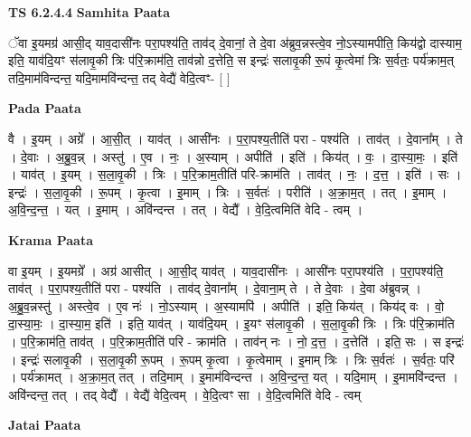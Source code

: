 \documentclass[17pt]{extarticle}
\begin{document}
\textbf{TS 6.2.4.4 } \newline
\textbf{Samhita Paata} \newline

ॅवा इ॒यमग्र॑ आसी॒द् याव॒दासी॑नः परा॒पश्य॑ति॒ ताव॑द् दे॒वानां॒ ते दे॒वा अ॑ब्रुव॒न्नस्त्वे॒व नो॒ऽस्यामपीति॒ किय॑द्वो दास्याम॒ इति॒ याव॑दि॒यꣳ स॑लावृ॒की त्रिः प॑रि॒क्राम॑ति॒ ताव॑न्नो द॒त्तेति॒ स इन्द्रः॑ सलावृ॒की रू॒पं कृ॒त्वेमां त्रिः स॒र्वतः॒ पर्य॑क्राम॒त् तदि॒माम॑विन्दन्त॒ यदि॒मामवि॑न्दन्त॒ तद् वेद्यै॑ वेदि॒त्वꣳ- [  ] \newline

\textbf{Pada Paata} \newline

वै । इ॒यम् । अग्रे᳚ । आ॒सी॒त् । याव॑त् । आसी॑नः । प॒रा॒पश्य॒तीति॑ परा - पश्य॑ति । ताव॑त् । दे॒वाना᳚म् । ते । दे॒वाः । अ॒ब्रु॒व॒न्न् । अस्तु॑ । ए॒व । नः॒ । अ॒स्याम् । अपीति॑ । इति॑ । किय॑त् । वः॒ । दा॒स्या॒मः॒ । इति॑ । याव॑त् । इ॒यम् । स॒ला॒वृ॒की । त्रिः । प॒रि॒क्राम॒तीति॑ परि-क्राम॑ति । ताव॑त् । नः॒ । द॒त्त॒ । इति॑ । सः । इन्द्रः॑ । स॒ला॒वृ॒की । रू॒पम् । कृ॒त्वा । इ॒माम् । त्रिः । स॒र्वतः॑ । परीति॑ । अ॒क्रा॒म॒त् । तत् । इ॒माम् । अ॒वि॒न्द॒न्त॒ । यत् । इ॒माम् । अवि॑न्दन्त । तत् । वेद्यै᳚ । वे॒दि॒त्वमिति॑ वेदि - त्वम् ।  \newline


\textbf{Krama Paata} \newline

वा इ॒यम् । इ॒यमग्रे᳚ । अग्र॑ आसीत् । आ॒सी॒द् याव॑त् । याव॒दासी॑नः । आसी॑नः परा॒पश्य॑ति । प॒रा॒पश्य॑ति॒ ताव॑त् । प॒रा॒पश्य॒तीति॑ परा - पश्य॑ति । ताव॑द् दे॒वाना᳚म् । दे॒वाना॒म् ते । ते दे॒वाः । दे॒वा अ॑ब्रुवन्न् । अ॒ब्रु॒व॒न्नस्तु॑ । अस्त्वे॒व । ए॒व नः॑ । नो॒ऽस्याम् । अ॒स्यामपि॑ । अपीति॑ । इति॒ किय॑त् । किय॑द् वः । वो॒ दा॒स्या॒मः॒ । दा॒स्या॒म॒ इति॑ । इति॒ याव॑त् । याव॑दि॒यम् । इ॒यꣳ स॑लावृ॒की । स॒ला॒वृ॒की त्रिः । त्रिः प॑रि॒क्राम॑ति । प॒रि॒क्राम॑ति॒ ताव॑त् । प॒रि॒क्राम॒तीति॑ परि - क्राम॑ति । ताव॑न् नः । नो॒ द॒त्त॒ । द॒त्तेति॑ । इति॒ सः । स इन्द्रः॑ । इन्द्रः॑ सलावृ॒की । स॒ला॒वृ॒की रू॒पम् । रू॒पम् कृ॒त्वा । कृ॒त्वेमाम् । इ॒माम् त्रिः । त्रिः स॒र्वतः॑ । स॒र्वतः॒ परि॑ । पर्य॑क्रामत् । अ॒क्रा॒म॒त् तत् । तदि॒माम् । इ॒माम॑विन्दन्त । अ॒वि॒न्द॒न्त॒ यत् । यदि॒माम् । इ॒मामवि॑न्दन्त । अवि॑न्दन्त॒ तत् । तद् वेद्यै᳚ । वेद्यै॑ वेदि॒त्वम् । वे॒दि॒त्वꣳ सा । वे॒दि॒त्वमिति॑ वेदि - त्वम् \newline

\textbf{Jatai Paata} \newline
\end{document}
